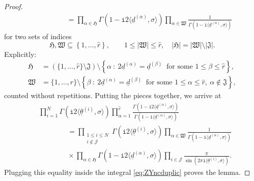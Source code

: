 \documentclass[10pt,a4paper]{amsart}
\newcommand{\ii}{\mathtt{i}}
\begin{document}
\begin{proof}
\begin{equation*}
\begin{aligned}
	& \qquad \qquad = \prod_{\alpha \in \mathfrak{H}} \Gamma \left( 1 - \ii 2 \langle\underline{d}^{(\alpha)}, \sigma \rangle \right) \prod_{\alpha \in \mathfrak{W}} \frac{1}{\Gamma \left( 1 - \ii \langle\underline{d}^{(\alpha)}, \sigma \rangle \right)}
\end{aligned}
\end{equation*}
for two sets of indices
\begin{equation*}
	\mathfrak{H},\mathfrak{W} \subseteq \left\{ 1, \dots, \hat{r} \right\} , \qquad 1 \le  \lvert \mathfrak{W} \rvert \le \hat{r} , \quad \lvert \mathfrak{H}\rvert =  \lvert \mathfrak{W} \rvert \setminus \lvert \mathfrak{J} \rvert .
\end{equation*}
Explicitly:
\begin{equation*}
\begin{aligned}
    \mathfrak{H} & =  \left( \{1, \dots, \hat{r} \} \setminus \mathfrak{J} \right) \setminus \left\{ \alpha \ : \ 2\underline{d}^{(\alpha)} = \underline{d}^{(\beta)} \ \text{ for some } 1 \le \beta \le \hat{r} \right\} , \\
    \mathfrak{W} & = \{1, \dots, \hat{r} \}  \setminus  \left\{ \beta \ : \ 2\underline{d}^{(\alpha)} = \underline{d}^{(\beta)} \ \text{ for some } 1 \le \alpha \le \hat{r}, \ \alpha \notin \mathfrak{J} \right\}  ,
\end{aligned}
\end{equation*}
counted without repetitions. Putting the pieces together, we arrive at 
\begin{align*}
	& \prod_{i=1}^{N} \Gamma \left( \ii 2 \langle \underline{\theta}^{(i)}, \sigma \rangle \right) \prod_{\alpha=1}^{\hat{r}} \frac{\Gamma \left( 1 - \ii 2 \langle\underline{d}^{(\alpha)}, \sigma \rangle \right) }{\Gamma \left( 1 - \ii \langle\underline{d}^{(\alpha)}, \sigma \rangle \right)} \\
 & \qquad \qquad = \prod_{\substack{ 1 \le i \le N \\ i \notin \mathcal{J} }} \Gamma \left( \ii 2 \langle \underline{\theta}^{(i)}, \sigma \rangle \right) \prod_{\alpha \in \mathfrak{W}} \frac{1}{\Gamma \left( 1 - \ii \langle\underline{d}^{(\alpha)}, \sigma \rangle \right)}\\
	& \qquad \qquad \times \prod_{\alpha\in \mathfrak{H} } \Gamma \left( 1 - \ii 2 \langle\underline{d}^{(\alpha)}, \sigma \rangle \right)  \prod_{i \in \mathcal{J} } \frac{\pi}{\sin \left( 2 \pi \ii \langle \underline{\theta}^{(i)}, \sigma \rangle\right)} .
\end{align*}
Plugging this equality inside the integral \eqref{eq:ZYncduplic} proves the lemma.
\end{proof}
\end{document}
